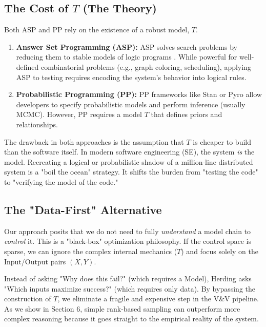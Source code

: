 \documentclass[runningheads]{llncs}
\begin{document}
\subsection{The Cost of $T$ (The Theory)}
Both ASP and PP rely on the existence of a robust model, $T$.
\begin{enumerate}
    \item \textbf{Answer Set Programming (ASP):} ASP solves search problems 
    by reducing them to stable models of logic programs \cite{Brewka2011}. While 
    powerful for well-defined combinatorial problems (e.g., graph coloring, 
    scheduling), applying ASP to testing requires encoding the system's 
    behavior into logical rules. 
    \item \textbf{Probabilistic Programming (PP):} PP frameworks like Stan 
    \cite{carpenter2017stan} or Pyro \cite{bingham2019pyro} allow developers to 
    specify probabilistic models and perform inference (usually MCMC). 
    However, PP requires a model  $T$ that defines priors and 
    relationships.
\end{enumerate}

The drawback in both approaches is the assumption that $T$ is cheaper to build 
than the software itself. In modern software engineering (SE), the system 
\textit{is} the model. Recreating a logical or probabilistic shadow of a 
million-line distributed system is a "boil the ocean" strategy. It shifts the 
burden from "testing the code" to "verifying the model of the code."

\subsection{The "Data-First" Alternative}
Our approach posits that we do not need to fully \textit{understand} a model 
chain to \textit{control} it. This is a "black-box" optimization philosophy. 
If the control space is sparse, we can ignore the complex internal mechanics 
($T$) and focus solely on the Input/Output pairs $(X, Y)$.

Instead of asking "Why does this fail?" (which requires a Model), Herding 
asks "Which inputs maximize success?" (which requires only data). By bypassing 
the construction of $T$, we eliminate a   fragile and expensive step in 
the V\&V pipeline. As we show in Section 6, simple rank-based sampling can
outperform more complex reasoning because it goes straight to the empirical 
reality of the system.
\end{document}
